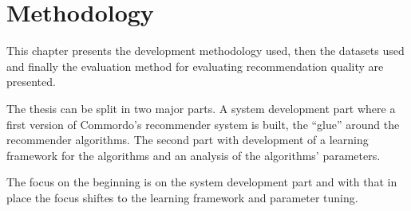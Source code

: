 \chapter{Methodology}\label{cha:method}

This chapter presents the development methodology used, then the datasets used and finally the evaluation method for evaluating recommendation quality are presented.

The thesis can be split in two major parts. A system development part where a first version of Commordo's recommender system is built, the ``glue'' around the recommender algorithms. The second part with development of a learning framework for the algorithms and an analysis of the algorithms' parameters.

The focus on the beginning is on the system development part and with that in place the focus shiftes to the learning framework and parameter tuning.





